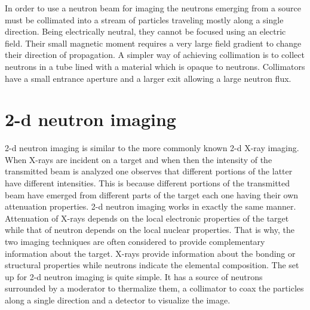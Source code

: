 \documentclass{article}
\numberwithin{equation}{section}
\begin{document}
In order to use a neutron beam for imaging the neutrons emerging from a source
must be collimated into a stream of particles traveling mostly along a single
direction. Being electrically neutral, they cannot be focused using an electric
field. Their small magnetic moment requires a very large field gradient to 
change their direction of propagation. A simpler way of achieving collimation
is to collect neutrons in a tube lined with a material which is opaque to 
neutrons. Collimators have a small entrance aperture and a larger exit allowing
a large neutron flux.

\section{2-d neutron imaging}\label{s8}
2-d neutron imaging is similar to the more commonly known 2-d X-ray imaging.
When X-rays are incident on a target and when then the intensity of the 
transmitted beam is analyzed one observes that different portions of the
latter have different intensities. This is because different portions of the
transmitted beam have emerged from different parts of the target each one
having their own attenuation properties. 2-d neutron imaging works in exactly
the same manner. Attenuation of X-rays depends on the local electronic
properties of the target while that of neutron depends on the local nuclear
properties. That is why, the two imaging techniques are often considered to
provide complementary information about the target. X-rays provide information
about the bonding or structural properties while neutrons indicate the 
elemental composition. The set up for 2-d neutron imaging is quite simple. It 
has a source of neutrons surrounded by a moderator to thermalize them, a 
collimator to coax the particles along a single direction and a detector to
visualize the image.
\end{document}

